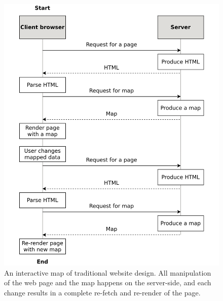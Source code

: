 \begin{figure}[H]
	\centering
	\includegraphics[width=\diagramwidth]{visual/figures/diagrams/server-side-app.png}
	\caption{
		An interactive map of traditional website design.
		All manipulation of the web page and the map happens on the server-side,
		and each change results in a complete re-fetch and re-render of the page.
	}
	\label{fig:server-side app}
\end{figure}


